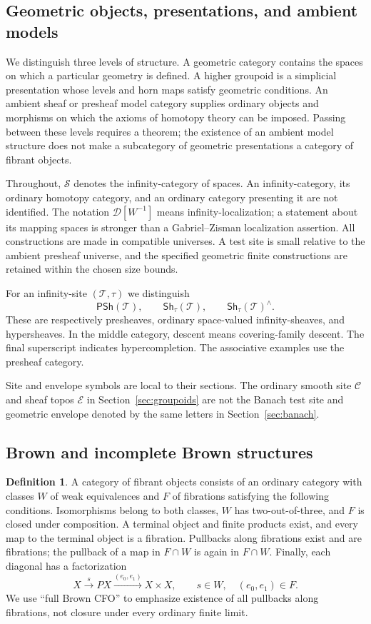 \documentclass[12pt]{amsart}
\theoremstyle{definition}
\newtheorem{defn}[thm]{Definition}
\theoremstyle{remark}
\numberwithin{equation}{section}
\newcommand{\CT}{\mathcal T}
\newcommand{\E}{\mathcal E}
\newcommand{\Sh}{\mathsf{Sh}}
\newcommand{\PSh}{\mathsf{PSh}}
\begin{document}
\subsection{Geometric objects, presentations, and ambient models}

We distinguish three levels of structure. A geometric category
contains the spaces on which a particular geometry is defined.
A higher groupoid is a simplicial presentation whose levels and
horn maps satisfy geometric conditions. An ambient sheaf or
presheaf model category supplies ordinary objects and morphisms
on which the axioms of homotopy theory can be imposed.
Passing between these levels requires a theorem; the existence
of an ambient model structure does not make a subcategory of
geometric presentations a category of fibrant objects.

Throughout, $\mathcal S$ denotes the infinity-category of spaces.
An infinity-category, its ordinary homotopy category, and an
ordinary category presenting it are not identified.
The notation $\mathcal D[W^{-1}]$ means infinity-localization;
a statement about its mapping spaces is stronger than a
Gabriel--Zisman localization assertion.
All constructions are made in compatible universes. A test
site is small relative to the ambient presheaf universe, and
the specified geometric finite constructions are retained
within the chosen size bounds.

For an infinity-site $(\CT,\tau)$ we distinguish
\[
 \PSh(\CT),\qquad
 \Sh_\tau(\CT),\qquad
 \Sh_\tau(\CT)^\wedge.
\]
These are respectively presheaves, ordinary space-valued
infinity-sheaves, and hypersheaves. In the middle category,
descent means covering-family descent. The final superscript
indicates hypercompletion. The associative examples use the
presheaf category.

Site and envelope symbols are local to their sections.
The ordinary smooth site $\mathcal C$ and sheaf topos $\E$
in Section~\ref{sec:groupoids} are not the Banach test
site and geometric envelope denoted by the same letters
in Section~\ref{sec:banach}.

\subsection{Brown and incomplete Brown structures}

\begin{defn}\label{def:brown-conventions}
A category of fibrant objects consists of an ordinary category
with classes $W$ of weak equivalences and $F$ of fibrations
satisfying the following conditions.
Isomorphisms belong to both classes, $W$ has two-out-of-three,
and $F$ is closed under composition. A terminal object and
finite products exist, and every map to the terminal object
is a fibration. Pullbacks along fibrations exist and are
fibrations; the pullback of a map in $F\cap W$ is again in
$F\cap W$. Finally, each diagonal has a factorization
\[
 X\xrightarrow{s}PX\xrightarrow{(e_0,e_1)}X\times X,
 \qquad s\in W,\quad(e_0,e_1)\in F.
\]
We use ``full Brown CFO'' to emphasize existence of all
pullbacks along fibrations, not closure under every
ordinary finite limit.
\end{defn}
\end{document}
